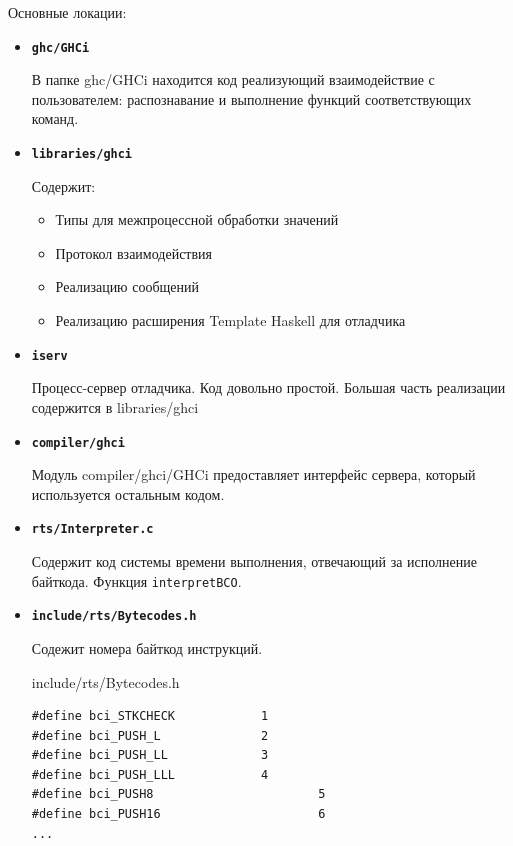 \documentclass[fontsize=14pt, paper=a4, pagesize, DIV=calc]{scrartcl}
\begin{document}
Основные локации:

\begin{itemize}

\item \textbf{\texttt{ghc/GHCi}}

В папке ghc/GHCi находится код реализующий взаимодействие с пользователем:
распознавание и выполнение функций соответствующих команд.

\item \textbf{\texttt{libraries/ghci}}

Содержит:

\begin{itemize}
\item Типы для межпроцессной обработки значений
\item Протокол взаимодействия
\item Реализацию сообщений
\item Реализацию расширения Template Haskell для отладчика
\end{itemize}

\item \textbf{\texttt{iserv}}

Процесс-сервер отладчика. Код довольно простой. Большая часть реализации
содержится в libraries/ghci

\item \textbf{\texttt{compiler/ghci}}

Модуль compiler/ghci/GHCi предоставляет интерфейс сервера, который используется
остальным кодом.

\item \textbf{\texttt{rts/Interpreter.c}}

Содержит код системы времени выполнения, отвечающий за исполнение байткода. 
Функция \texttt{interpretBCO}.

\item \textbf{\texttt{include/rts/Bytecodes.h}}

Содежит номера байткод инструкций.

\begin{ListingEnv}
\caption{include/rts/Bytecodes.h}
\begin{lstlisting}[firstnumber=26]
#define bci_STKCHECK            1
#define bci_PUSH_L              2
#define bci_PUSH_LL             3
#define bci_PUSH_LLL            4
#define bci_PUSH8                       5
#define bci_PUSH16                      6
...
\end{lstlisting}
\end{ListingEnv}

\end{itemize}
\end{document}
